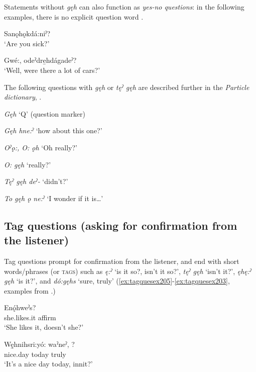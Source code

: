 Statements without \textit{gęh} can also function as \textit{yes-no questions}: in the following examples, there is no explicit question word .

\ea\label{ex:statquesex}
\ea Sanǫhǫkdá:niˀ?\\
\glt ‘Are you sick?’

\ex Gwé:, odeˀdre̱hdágadeˀ? \\
\glt ‘Well, were there a lot of cars?’
\z
\z

The following questions with \textit{gęh} or \textit{tęˀ gęh} are described further in the \textit{Particle dictionary}, .

\begin{CayugaRelated}
\item{}\textit{Gęh} ‘Q’ (question marker)\\
\item{}\textit{Gęh hne:ˀ} ‘how about this one?’\\
\item{}\textit{Oˀǫ:, O: ǫh} ‘Oh really?’\\
\item{}\textit{O: gęh} ‘really?’\\
\item{}\textit{Tęˀ gęh deˀ-} ‘didn't?’\\
\item{}\textit{To gęh ǫ ne:ˀ} ‘I wonder if it is…’
\end{CayugaRelated}

\subsection{Tag questions (asking for confirmation from the listener)} \label{Tag questions (asking for confirmation from the listener)}
Tag questions prompt for confirmation from the listener, and end with short words/phrases (or \textsc{tags}) such as \textit{ę:ˀ} ‘is it so?, isn’t it so?’, \textit{tęˀ gęh} ‘isn't it?’, \textit{ęhę:ˀ gęh} ‘is it?’, and \textit{dó:gęhs} ‘sure, truly’ (\ref{ex:tagquesex205}-\ref{ex:tagquesex203}, examples from \cite{deer_cayuga_2015}.)


\ea\label{ex:tagquesex205} 
\gll Enǫ́hweˀs? \\
she.likes.it affirm\\
\glt ‘She likes it, doesn’t she?’
\z

\ea\label{ex:tagquesex200} 
\gll Wę̱hnihsri:yó: waˀneˀ, ? \\
nice.day today truly\\
\glt ‘It’s a nice day today, innit?’
\z


